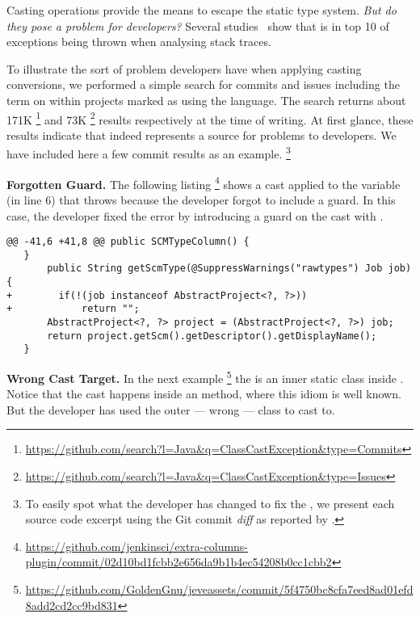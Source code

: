 
Casting operations provide the means to escape the static type system.
\emph{But do they pose a problem for developers?}
Several studies~\citep{kechagiaUndocumentedUncheckedExceptions2014,coelhoUnveilingExceptionHandling2015,zhitnitskyTop10Exception2016} show that  is in top 10 of exceptions being
thrown when analysing stack traces.

To illustrate the sort of problem developers have when applying casting conversions, we performed a simple search for commits and issues including the term  on \github{} within projects marked as using the \java{} language.
The search returns about 171K%
\footnote{\url{https://github.com/search?l=Java&q=ClassCastException&type=Commits}}
and 73K%
\footnote{\url{https://github.com/search?l=Java&q=ClassCastException&type=Issues}}
results respectively at the time of writing.
At first glance, these results indicate that indeed  represents a source for problems to developers.
We have included here a few commit results as an example.%
\footnote{To easily spot what the developer has changed to fix the , we present each source code excerpt using the Git commit \emph{diff} as reported by \github{}.}

\textbf{Forgotten Guard.}
The following listing%
\footnote{\url{https://github.com/jenkinsci/extra-columns-plugin/commit/02d10bd1fcbb2e656da9b1b4ec54208b0cc1cbb2}}
shows a cast applied to the variable  (in line 6) that throws  because the developer forgot to include a guard.
In this case, the developer fixed the error by introducing a guard on the cast with .

\begin{lstlisting}[style=java]
@@ -41,6 +41,8 @@ public SCMTypeColumn() {
   }
       public String getScmType(@SuppressWarnings("rawtypes") Job job) {
+        if(!(job instanceof AbstractProject<?, ?>))
+            return "";
       AbstractProject<?, ?> project = (AbstractProject<?, ?>) job;
       return project.getScm().getDescriptor().getDisplayName();
   }
\end{lstlisting}

\textbf{Wrong Cast Target.}
In the next example%
\footnote{\url{https://github.com/GoldenGnu/jeveassets/commit/5f4750bc8cfa7eed8ad01efd8add2cd2cc9bd831}}
the  is an inner static class inside .
Notice that the cast happens inside an  method, where this idiom is well known.
But the developer has used the outer --- wrong --- class to cast to.

